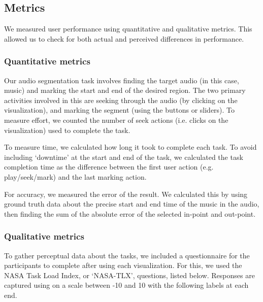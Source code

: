 \subsection{Metrics}

We measured user performance using quantitative and qualitative metrics.  This allowed us to check for both actual and
perceived differences in performance.

\subsubsection{Quantitative metrics}
Our audio segmentation task involves finding the target audio (in this case, music) and marking the start and end of
the desired region. The two primary activities involved in this are seeking through the audio (by clicking on the
visualization), and marking the segment (using the buttons or sliders). To measure effort, we counted the number of
seek actions (i.e. clicks on the visualization) used to complete the task.

To measure time, we calculated how long it took to complete each task. To avoid including `downtime' at the start and
end of the task, we calculated the task completion time as the difference between the first user action (e.g.
play/seek/mark) and the last marking action.

For accuracy, we measured the error of the result. We calculated this by using ground truth data about the precise
start and end time of the music in the audio, then finding the sum of the absolute error of the selected in-point and
out-point.

\subsubsection{Qualitative metrics}

To gather perceptual data about the tasks, we included a questionnaire for the participants to complete after using
each visualization.  For this, we used the NASA Task Load Index, or `NASA-TLX', \citep{Hart1988} questions, listed
below. Responses are captured using on a scale between -10 and 10 with the following labels at each end.

